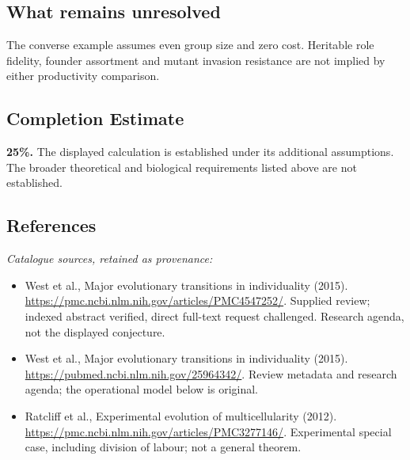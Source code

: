 \documentclass[11pt]{article}
\begin{document}
\subsection{What remains unresolved}
The converse example assumes even group size and zero cost. Heritable role fidelity, founder assortment and mutant invasion resistance are not implied by either productivity comparison.
\subsection{Completion Estimate}
\textbf{25\%.} The displayed calculation is established under its additional assumptions. The broader theoretical and biological requirements listed above are not established.
\subsection{References}
\noindent\emph{Catalogue sources, retained as provenance:}
\begin{itemize}
\item West et al., Major evolutionary transitions in individuality (2015). \url{https://pmc.ncbi.nlm.nih.gov/articles/PMC4547252/}. Supplied review; indexed abstract verified, direct full-text request challenged. Research agenda, not the displayed conjecture.
\item West et al., Major evolutionary transitions in individuality (2015). \url{https://pubmed.ncbi.nlm.nih.gov/25964342/}. Review metadata and research agenda; the operational model below is original.
\item Ratcliff et al., Experimental evolution of multicellularity (2012). \url{https://pmc.ncbi.nlm.nih.gov/articles/PMC3277146/}. Experimental special case, including division of labour; not a general theorem.
\end{itemize}
\clearpage


\appendix
\end{document}
